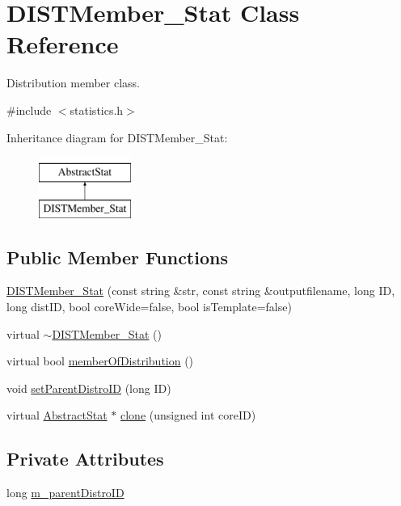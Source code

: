 \hypertarget{classDISTMember__Stat}{
\section{DISTMember\_\-Stat Class Reference}
\label{classDISTMember__Stat}
}


Distribution member class.  




{\ttfamily \#include $<$statistics.h$>$}

Inheritance diagram for DISTMember\_\-Stat:\begin{figure}[H]
\begin{center}
\leavevmode
\includegraphics[height=2.000000cm]{classDISTMember__Stat}
\end{center}
\end{figure}
\subsection*{Public Member Functions}
\begin{DoxyCompactItemize}
\item 
\hyperlink{classDISTMember__Stat_a42b92bba8d7d564ead7e520a071fbb92}{DISTMember\_\-Stat} (const string \&str, const string \&outputfilename, long ID, long distID, bool coreWide=false, bool isTemplate=false)
\item 
virtual \hyperlink{classDISTMember__Stat_a499ff709db253422a0ba3d249fd9f828}{$\sim$DISTMember\_\-Stat} ()
\item 
virtual bool \hyperlink{classDISTMember__Stat_a0b0238ffd723c62d9f1d52c7499296c0}{memberOfDistribution} ()
\item 
void \hyperlink{classDISTMember__Stat_ad23f94e3c35b4009cd87490eded85bfc}{setParentDistroID} (long ID)
\item 
virtual \hyperlink{classAbstractStat}{AbstractStat} $\ast$ \hyperlink{classDISTMember__Stat_a3a20618868cfc2ac768e0e640049ffad}{clone} (unsigned int coreID)
\end{DoxyCompactItemize}
\subsection*{Private Attributes}
\begin{DoxyCompactItemize}
\item 
long \hyperlink{classDISTMember__Stat_a161cdc74a36982281bcbfb0240509f44}{m\_\-parentDistroID}
\end{DoxyCompactItemize}
